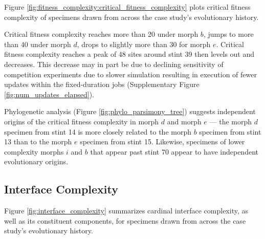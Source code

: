 Figure \ref{fig:fitness_complexity:critical_fitness_complexity} plots critical fitness complexity of specimens drawn from across the case study's evolutionary history.

Critical fitness complexity reaches more than 20 under morph $b$, jumps to more than 40 under morph $d$, drops to slightly more than 30 for morph $e$.
Critical fitness complexity reaches a peak of 48 sites around stint 39 then levels out and decreases.
This decrease may in part be due to declining sensitivity of competition experiments due to slower simulation resulting in execution of fewer updates within the fixed-duration jobs (Supplementary Figure \ref{fig:num_updates_elapsed}).

Phylogenetic analysis (Figure \ref{fig:phylo_parsimony_tree}) suggests independent origins of the critical fitness complexity in morph $d$ and morph $e$ --- the morph $d$ specimen from stint 14 is more closely related to the morph $b$ specimen from stint 13 than to the morph $e$ specimen from stint 15.
Likewise, specimens of lower complexity morphs $i$ and $b$ that appear past stint 70 appear to have independent evolutionary origins.




\subsection{Interface Complexity}



Figure \ref{fig:interface_complexity} summarizes cardinal interface complexity, as well as its constituent components, for specimens drawn from across the case study's evolutionary history.

